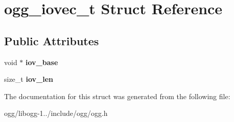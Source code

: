 \hypertarget{structogg__iovec__t}{\section{ogg\+\_\+iovec\+\_\+t Struct Reference}
\label{structogg__iovec__t}
}
\subsection*{Public Attributes}
\begin{DoxyCompactItemize}
\item 
\hypertarget{structogg__iovec__t_a0f663ecfcbdf22457f38f9308dd67166}{void $\ast$ {\bfseries iov\+\_\+base}}\label{structogg__iovec__t_a0f663ecfcbdf22457f38f9308dd67166}

\item 
\hypertarget{structogg__iovec__t_a52b887e0511104920cdc181c9e4136ce}{size\+\_\+t {\bfseries iov\+\_\+len}}\label{structogg__iovec__t_a52b887e0511104920cdc181c9e4136ce}

\end{DoxyCompactItemize}


The documentation for this struct was generated from the following file\+:\begin{DoxyCompactItemize}
\item 
ogg/libogg-\/1../include/ogg/ogg.\+h\end{DoxyCompactItemize}
